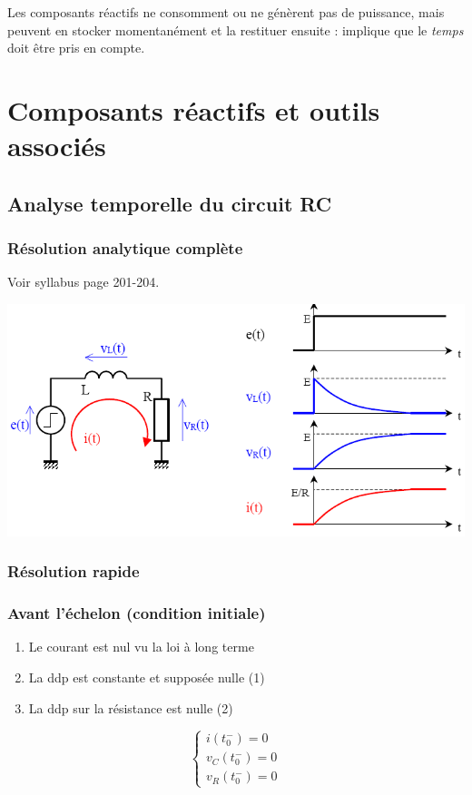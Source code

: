 \documentclass	[11pt, a4paper, openany]{book}
\begin{document}
Les composants réactifs ne consomment ou ne génèrent pas de puissance, mais peuvent en stocker momentanément et la restituer ensuite : implique que le \textit{temps} doit être pris en compte.




\newpage
\section{Composants réactifs et outils associés}
\subsection{Analyse temporelle du circuit RC}
\subsubsection{Résolution analytique complète}
Voir syllabus page 201-204.
\begin{center}
\includegraphics[scale=0.4]{img/image11.png}
\end{center}

\subsubsection{Résolution rapide}
\subsubsection{Avant l'échelon (condition initiale)}
\begin{enumerate}
\item Le courant est nul vu la loi à long terme
\item La ddp est constante et supposée nulle (1)
\item La ddp sur la résistance est nulle (2)
\end{enumerate}
\begin{equation}
\left\{\begin{array}{l}
i(t_0^-) = 0\\
v_C(t_0^-) = 0\\
v_R(t_0^-) = 0
\end{array}\right.
\end{equation}
\end{document}

